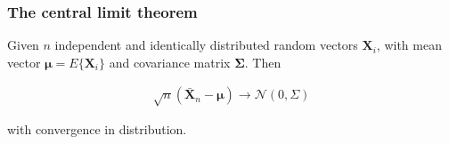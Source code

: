 \documentclass[11pt]{beamer}
\begin{document}
\begin{frame}
    \frametitle{The central limit theorem \citep{papoulisAndPillai02}}

	\begin{theorem}
		Given $n$ independent and identically distributed random vectors $\mathbf{X}_i$, with mean vector $\boldsymbol{\mu}=E\{\mathbf{X}_i\}$ and covariance matrix $\mathbf{\Sigma}$. Then

		\begin{align*}
			\sqrt{n}(\bar{\mathbf{X}}_n-\boldsymbol{\mu})\rightarrow\mathcal{N}(0,\Sigma)
		\end{align*}

		with convergence in distribution.
	\end{theorem}
\end{frame}
\end{document}
